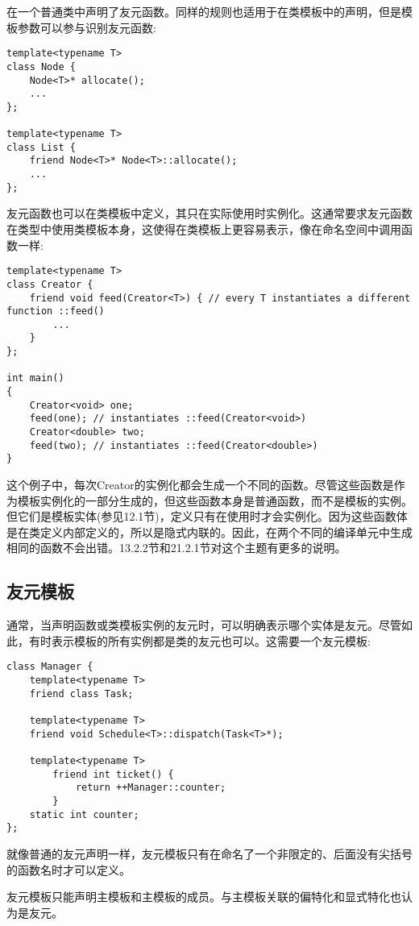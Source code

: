 在一个普通类中声明了友元函数。同样的规则也适用于在类模板中的声明，但是模板参数可以参与识别友元函数:

\begin{lstlisting}[style=styleCXX]
template<typename T>
class Node {
	Node<T>* allocate();
	...
};

template<typename T>
class List {
	friend Node<T>* Node<T>::allocate();
	...
};
\end{lstlisting}

友元函数也可以在类模板中定义，其只在实际使用时实例化。这通常要求友元函数在类型中使用类模板本身，这使得在类模板上更容易表示，像在命名空间中调用函数一样:

\begin{lstlisting}[style=styleCXX]
template<typename T>
class Creator {
	friend void feed(Creator<T>) { // every T instantiates a different function ::feed()
		...
	}
};

int main()
{
	Creator<void> one;
	feed(one); // instantiates ::feed(Creator<void>)
	Creator<double> two;
	feed(two); // instantiates ::feed(Creator<double>)
}
\end{lstlisting}

这个例子中，每次Creator的实例化都会生成一个不同的函数。尽管这些函数是作为模板实例化的一部分生成的，但这些函数本身是普通函数，而不是模板的实例。但它们是模板实体(参见12.1节)，定义只有在使用时才会实例化。因为这些函数体是在类定义内部定义的，所以是隐式内联的。因此，在两个不同的编译单元中生成相同的函数不会出错。13.2.2节和21.2.1节对这个主题有更多的说明。

\subsection{友元模板}

通常，当声明函数或类模板实例的友元时，可以明确表示哪个实体是友元。尽管如此，有时表示模板的所有实例都是类的友元也可以。这需要一个友元模板:

\begin{lstlisting}[style=styleCXX]
class Manager {
	template<typename T>
	friend class Task;
	
	template<typename T>
	friend void Schedule<T>::dispatch(Task<T>*);
	
	template<typename T>
		friend int ticket() {
			return ++Manager::counter;
		}
	static int counter;
};
\end{lstlisting}

就像普通的友元声明一样，友元模板只有在命名了一个非限定的、后面没有尖括号的函数名时才可以定义。

友元模板只能声明主模板和主模板的成员。与主模板关联的偏特化和显式特化也认为是友元。








